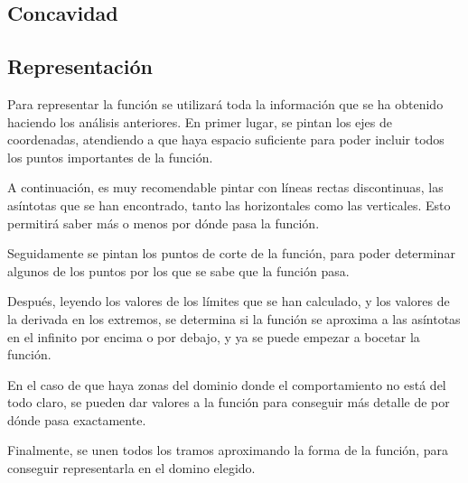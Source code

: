 \documentclass[sans]{apuntes}
\begin{document}
\subsection{Concavidad}

\subsection{Representación}
Para representar la función se utilizará toda la información que se ha obtenido haciendo los análisis anteriores. En primer lugar, se pintan los ejes de coordenadas, atendiendo a que haya espacio suficiente para poder incluir todos los puntos importantes de la función.
\par A continuación, es muy recomendable pintar con líneas rectas discontinuas, las asíntotas que se han encontrado, tanto las horizontales como las verticales. Esto permitirá saber más o menos por dónde pasa la función.
\par Seguidamente se pintan los puntos de corte de la función, para poder determinar algunos de los puntos por los que se sabe que la función pasa.
\par Después, leyendo los valores de los límites que se han calculado, y los valores de la derivada en los extremos, se determina si la función se aproxima a las asíntotas en el infinito por encima o por debajo, y ya se puede empezar a bocetar la función.
\par En el caso de que haya zonas del dominio donde el comportamiento no está del todo claro, se pueden dar valores a la función para conseguir más detalle de por dónde pasa exactamente.
\par Finalmente, se unen todos los tramos aproximando la forma de la función, para conseguir representarla en el domino elegido.
\end{document}
